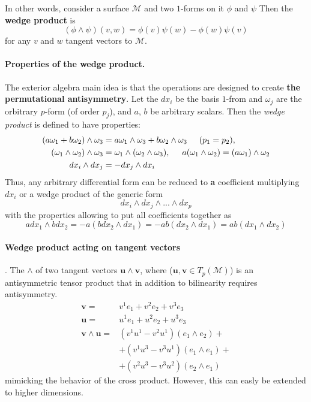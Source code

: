 {    In other words, consider a surface $\mathcal{M}$ and two $1$-forms on it $\phi$ and $\psi$ Then the \textbf{wedge product} is 
    \begin{equation}
    (\phi\wedge\psi)(v,w)=\phi(v)\psi(w) - \phi(w)\psi(v)
    \end{equation}
    for any $v$ and $w$ tangent vectors to $\mathcal{M}$.
    
    \paragraph{Properties of the wedge product.} The exterior algebra main idea is that the operations are designed to create \textbf{the permutational antisymmetry}. 
    Let the $dx_i$ be the basis $1$-from and $\omega_j$ are the orbitrary $p$-form (of order $p_j$), and $a$, $b$ be arbitrary scalars. 
    Then the \textit{wedge product} is defined to have properties:
    \begin{align}
    (a\omega_1+b\omega_2)\wedge\omega_3 &= a\omega_1\wedge\omega_3+b\omega_2\wedge\omega_3 \hspace{5mm} (p_1 = p_2), \\
    (\omega_1\wedge\omega_2)\wedge\omega_3 &= \omega_1\wedge(\omega_2\wedge\omega_3), \hspace{5mm} a(\omega_1\wedge\omega_2) =  (a\omega_1)\wedge\omega_2\\
    dx_i\wedge dx_j &= -dx_j\wedge dx_i
    \end{align}
    Thus, any arbitrary differential form can be reduced to \textbf{a} coefficient multiplying $dx_i$ or a wedge product of the generic form 
    \begin{equation}
    dx_i\wedge dx_j \wedge...\wedge dx_p
    \end{equation}
    with the properties allowing to put all coefficients together as 
    \begin{equation}
    a dx_1 \wedge b dx_2 = - a(b dx_2 \wedge dx_1) = -ab(dx_2 \wedge dx_1) = ab(dx_1 \wedge dx_2)
    \end{equation}
    
    \paragraph{Wedge product acting on tangent vectors}.
    The $\wedge$ of two tangent vectors $\boldsymbol{u}\wedge\boldsymbol{v}$, where ($\boldsymbol{u}, \boldsymbol{v}\in T_p(\mathcal{M})$) is an antisymmetric tensor product that in addition to bilinearity requires antisymmetry. 
    \begin{align}
    \boldsymbol{v} =& v^1e_1 + v^2 e_2 + v^3 e_3 \\
    \boldsymbol{u} =& u^1e_1 + u^2 e_2 + u^3 e_3 \\
    \boldsymbol{v}\wedge\boldsymbol{u} =& (v^1u^1 - v^2u^1)(e_1\wedge e_2) + \\
    & + (v^1u^3 - v^3u^1)(e_1\wedge e_1) + \\
    & + (v^2u^3 - v^3u^2)(e_2\wedge e_1)
    \end{align}
    mimicking the behavior of the cross product. 
    However, this can easly be extended to higher dimensions. 
    
}
